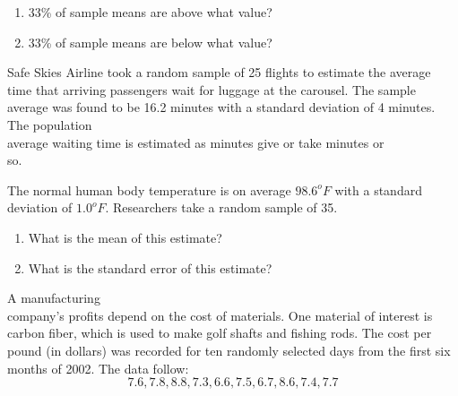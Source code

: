 \documentclass[11pt, chapterprefix=true]{scrbook}\usepackage[]{graphicx}\usepackage[]{color}
\begin{document}
\begin{exercises}
\begin{solution}
\begin{enumerate}
  

  \item 33\% of sample means are above what value? 
  \item 33\% of sample means are below what value?
\end{enumerate}
\end{solution}

\begin{exercise}  %

Safe Skies Airline took a random sample of 25 flights to estimate the average time that arriving passengers wait for luggage at the carousel.  The sample average was found to be 16.2 minutes with a standard deviation of 4 minutes.  The population \\ average waiting time is estimated as \underline{\phantom{xxxxxxxx}} minutes give or take \underline{\phantom{xxxxxxxx}} minutes or \\ so.

\end{exercise}
\begin{solution}  %

\end{solution}

\begin{exercise}  %

The normal human body temperature is on average $98.6^o F$ with a standard deviation of $1.0^o F$. Researchers take a random sample of 35. 

\begin{enumerate}
\item What is the mean of this estimate? 
\item What is the standard error of this estimate?
\end{enumerate}

\end{exercise}
\begin{solution}  %

\end{solution}

\begin{exercise}  %

A manufacturing \\ company's profits depend on the cost of materials.  One material of interest is carbon fiber, which is used to make golf shafts and fishing rods.  The cost per pound (in dollars) was recorded for ten randomly selected days from the first six months of 2002. The data follow:
            $$7.6, 7.8, 8.8, 7.3, 6.6, 7.5, 6.7, 8.6, 7.4, 7.7$$
            

\end{exercise}
\end{exercises}
\end{document}
